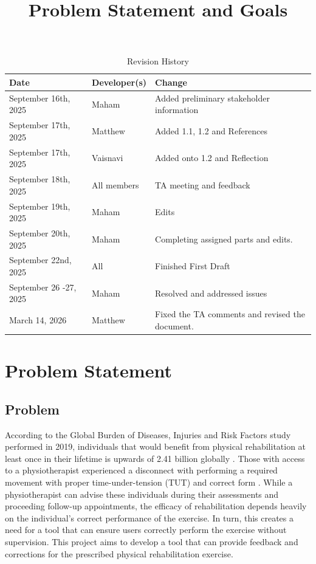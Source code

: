 \documentclass{article}
\title{Problem Statement and Goals\\\progname}
\author{\authname}
\date{}
\begin{document}
\maketitle

\begin{table}[hp]
\caption{Revision History} \label{TblRevisionHistory}
\begin{tabularx}{\textwidth}{llX}
\toprule
\textbf{Date} & \textbf{Developer(s)} & \textbf{Change}\\
\midrule
September 16th, 2025 & Maham & Added preliminary stakeholder information\\
September 17th, 2025 & Matthew & Added 1.1, 1.2 and References\\
September 17th, 2025 & Vaisnavi & Added onto 1.2 and Reflection\\
September 18th, 2025 & All members & TA meeting and feedback\\
September 19th, 2025 & Maham & Edits \\
September 20th, 2025 & Maham & Completing assigned parts and edits. \\
September 22nd, 2025 & All & Finished First Draft \\
September 26 -27, 2025 & Maham & Resolved and addressed issues\\
March 14, 2026 & Matthew & Fixed the TA comments and revised the document.\\

\bottomrule
\end{tabularx}
\end{table}

\section{Problem Statement}

\subsection{Problem}

According to the Global Burden of Diseases, Injuries and Risk Factors study performed in 2019, individuals that would benefit from physical rehabilitation at least once in their lifetime is upwards of 2.41 billion globally \citep{CiezaEtAl2021}. Those with access to a physiotherapist experienced a disconnect with performing a required movement with proper time-under-tension (TUT) and correct form \citep{FaberEtAl2015}. While a physiotherapist can advise these individuals during their assessments and proceeding follow-up appointments, the efficacy of rehabilitation depends heavily on the individual's correct performance of the exercise. In turn, this creates a need for a tool that can ensure users correctly perform the exercise without supervision. This project aims to develop a tool that can provide feedback and corrections for the prescribed physical rehabilitation exercise.
\end{document}
